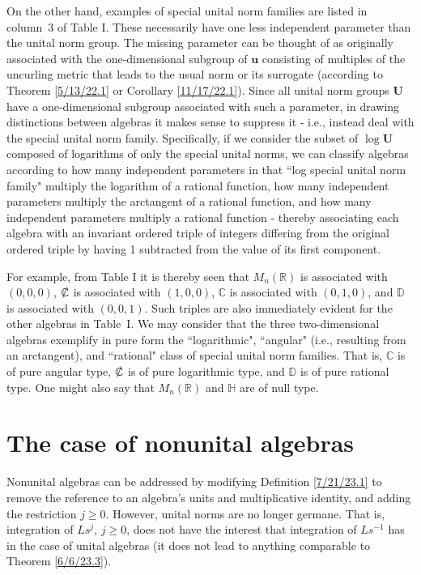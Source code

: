 \documentclass{amsart}
\numberwithin{equation}{section}
\theoremstyle{definition}
\numberwithin{theorem}{section}
\begin{document}
On the other hand, examples of special unital norm families are listed in \mbox{column 3} of Table I.  These necessarily have one less independent parameter than the unital norm group.  The missing parameter can be thought of as originally associated with the one-dimensional subgroup of $\mathbf{u}$ consisting of multiples of the uncurling metric that leads to the usual norm or its surrogate (according to Theorem \ref{5/13/22.1} or Corollary \ref{11/17/22.1}).  Since all unital norm groups $\mathbf{U}$ have a one-dimensional subgroup associated with such a parameter, in drawing distinctions between algebras it makes sense to suppress it - i.e., instead deal with the special unital norm family.  Specifically, if we consider the subset of $\log \mathbf{U}$ composed of logarithms of only the special unital norms, we can classify algebras according to how many independent parameters in that ``log special unital norm family" multiply the logarithm of a rational function, how many independent parameters multiply the arctangent of a rational function, and how many independent parameters multiply a rational function - thereby associating each algebra with an invariant ordered triple of integers differing from the original ordered triple by having 1 subtracted from the value of its first component.
 

For example, from Table I it is thereby seen that $M_n(\mathbb{R})$ is associated with $(0,0,0)$,  $\slashed{\mathbb{C}}$ is associated with $(1,0,0)$, $\mathbb{C}$ is associated with $(0,1,0)$, and $\mathbb{D}$ is associated with $(0,0,1)$.  Such triples are also immediately evident for the other algebras in \mbox{Table I}.
We may consider that the three two-dimensional algebras exemplify in pure form the ``logarithmic", ``angular" (i.e., resulting from an arctangent), and ``rational" class of special unital norm families.  That is, $\mathbb{C}$ is of pure angular type, $\slashed{\mathbb{C}}$ is of pure logarithmic type, and $\mathbb{D}$ is of pure rational type. One might also say that $M_n(\mathbb{R})$ and $\mathbb{H}$ are of null type. 
 
 \section{The case of nonunital algebras} Nonunital algebras can be addressed by modifying Definition \ref{7/21/23.1} to remove the reference to an algebra's units and multiplicative identity, and adding the restriction $j\ge 0$.   However, unital norms are no longer germane.  That is, integration of $Ls^j$, $j\ge 0$, does not have the interest that integration of $Ls^{-1}$ has in the case of unital algebras (it does not lead to anything comparable to Theorem \ref{6/6/23.3}).
\end{document}
